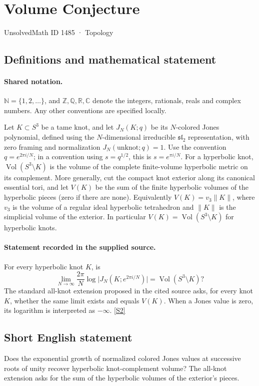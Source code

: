 \documentclass[11pt]{article}
\newcommand{\sref}[2]{\hyperlink{source:#1:#2}{[S#2]}}
\begin{document}
\setcounter{section}{1484}
\section{Volume Conjecture}\label{1485}
{\small\sffamily UnsolvedMath ID 1485 · Topology}
\subsection{Definitions and mathematical statement}

\paragraph{Shared notation.}$\mathbb N=\{1,2,\ldots\}$, and $\mathbb Z,\mathbb Q,\mathbb R,\mathbb C$ denote the integers, rationals, reals and complex numbers. Any other conventions are specified locally.


Let \(K\subset S^3\) be a tame knot, and let \(J_N(K;q)\)
be its \(N\)-colored Jones polynomial, defined using the
\(N\)-dimensional irreducible \(\mathfrak{sl}_2\) representation,
with zero framing and normalization \(J_N(\text{unknot};q)=1\).
Use the convention \(q=e^{2\pi i/N}\); in a convention using
\(s=q^{1/2}\), this is \(s=e^{\pi i/N}\).
For a hyperbolic knot, \(\operatorname{Vol}(S^3\setminus K)\) is
the volume of the complete finite-volume hyperbolic metric on its
complement. More generally, cut the compact knot exterior along its
canonical essential tori, and let \(V(K)\) be the sum of the
finite hyperbolic volumes of the hyperbolic pieces (zero if there are none).
Equivalently \(V(K)=v_3\|K\|\), where \(v_3\) is the volume of a
regular ideal hyperbolic tetrahedron and \(\|K\|\) is the simplicial
volume of the exterior. In particular \(V(K)=\operatorname{Vol}(S^3\setminus K)\)
for hyperbolic knots.
\paragraph{Statement recorded in the supplied source.}
For every hyperbolic knot \(K\), is
\[
 \lim_{N\to\infty}\frac{2\pi}{N}
      \log\bigl|J_N(K;e^{2\pi i/N})\bigr|
       =\operatorname{Vol}(S^3\setminus K)?
\]
The standard all-knot extension proposed in the cited source asks,
for every knot \(K\), whether the same limit exists and equals \(V(K)\).
When a Jones value is zero, its logarithm is interpreted as \(-\infty\). \sref{1485}{2}
\subsection{Short English statement}
Does the exponential growth of normalized colored Jones values at successive roots of unity recover hyperbolic knot-complement volume? The all-knot extension asks for the sum of the hyperbolic volumes of the exterior's pieces.
\end{document}
